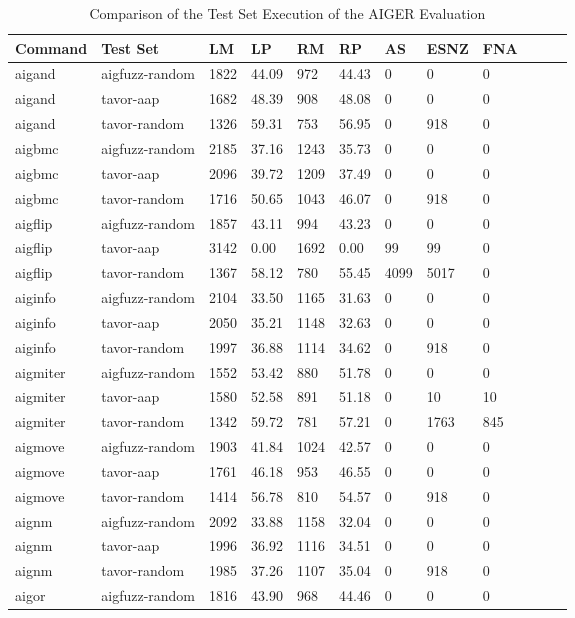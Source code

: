 \begin{table}
\caption{Comparison of the Test Set Execution of the AIGER Evaluation}
\label{table:evaluationAIGERExecution}
\begin{small}
\begin{center}
\begin{threeparttable}
\begin{tabular}{| l | l | l | l | l | l | l | l | l | l | l | l |}
\hline
  \textbf{Command}
& \textbf{Test Set}
& \textbf{LM} %
& \textbf{LP} %
& \textbf{RM} %
& \textbf{RP} %
& \textbf{AS} %
& \textbf{ESNZ} %
& \textbf{FNA} %
\tabularnewline
\hline aigand & aigfuzz-random & 1822 & 44.09 & 972 & 44.43 & 0 & 0 & 0 \tabularnewline
\hline aigand & tavor-aap & 1682 & 48.39 & 908 & 48.08 & 0 & 0 & 0 \tabularnewline
\hline aigand & tavor-random & 1326 & 59.31 & 753 & 56.95 & 0 & 918 & 0 \tabularnewline
\hline aigbmc & aigfuzz-random & 2185 & 37.16 & 1243 & 35.73 & 0 & 0 & 0 \tabularnewline
\hline aigbmc & tavor-aap & 2096 & 39.72 & 1209 & 37.49 & 0 & 0 & 0 \tabularnewline
\hline aigbmc & tavor-random & 1716 & 50.65 & 1043 & 46.07 & 0 & 918 & 0 \tabularnewline
\hline aigflip & aigfuzz-random & 1857 & 43.11 & 994 & 43.23 & 0 & 0 & 0 \tabularnewline
\hline aigflip & tavor-aap & 3142 & 0.00 & 1692 & 0.00 & 99 & 99 & 0 \tabularnewline
\hline aigflip & tavor-random & 1367 & 58.12 & 780 & 55.45 & 4099 & 5017 & 0 \tabularnewline
\hline aiginfo & aigfuzz-random & 2104 & 33.50 & 1165 & 31.63 & 0 & 0 & 0 \tabularnewline
\hline aiginfo & tavor-aap & 2050 & 35.21 & 1148 & 32.63 & 0 & 0 & 0 \tabularnewline
\hline aiginfo & tavor-random & 1997 & 36.88 & 1114 & 34.62 & 0 & 918 & 0 \tabularnewline
\hline aigmiter & aigfuzz-random & 1552 & 53.42 & 880 & 51.78 & 0 & 0 & 0 \tabularnewline
\hline aigmiter & tavor-aap & 1580 & 52.58 & 891 & 51.18 & 0 & 10 & 10 \tabularnewline
\hline aigmiter & tavor-random & 1342 & 59.72 & 781 & 57.21 & 0 & 1763 & 845 \tabularnewline
\hline aigmove & aigfuzz-random & 1903 & 41.84 & 1024 & 42.57 & 0 & 0 & 0 \tabularnewline
\hline aigmove & tavor-aap & 1761 & 46.18 & 953 & 46.55 & 0 & 0 & 0 \tabularnewline
\hline aigmove & tavor-random & 1414 & 56.78 & 810 & 54.57 & 0 & 918 & 0 \tabularnewline
\hline aignm & aigfuzz-random & 2092 & 33.88 & 1158 & 32.04 & 0 & 0 & 0 \tabularnewline
\hline aignm & tavor-aap & 1996 & 36.92 & 1116 & 34.51 & 0 & 0 & 0 \tabularnewline
\hline aignm & tavor-random & 1985 & 37.26 & 1107 & 35.04 & 0 & 918 & 0 \tabularnewline
\hline aigor & aigfuzz-random & 1816 & 43.90 & 968 & 44.46 & 0 & 0 & 0 \tabularnewline

\end{tabular}
\end{threeparttable}
\end{center}
\end{small}
\end{table}
